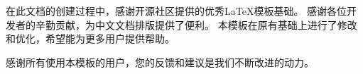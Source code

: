 \acks
在此文档的创建过程中，感谢开源社区提供的优秀LaTeX模板基础。
感谢各位开发者的辛勤贡献，为中文文档排版提供了便利。
本模板在原有基础上进行了修改和优化，希望能为更多用户提供帮助。

感谢所有使用本模板的用户，您的反馈和建议是我们不断改进的动力。
